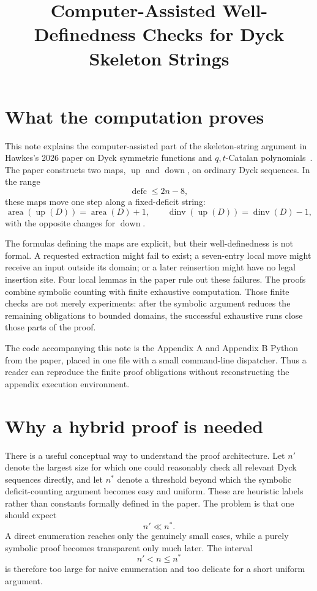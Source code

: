 \documentclass{article}
\title{Computer-Assisted Well-Definedness Checks for Dyck Skeleton Strings}
\author{}
\date{}
\newcommand{\area}{\operatorname{area}}
\newcommand{\dinv}{\operatorname{dinv}}
\newcommand{\defc}{\operatorname{defc}}
\newcommand{\upmap}{\operatorname{up}}
\newcommand{\downmap}{\operatorname{down}}
\begin{document}
\maketitle

\section{What the computation proves}

This note explains the computer-assisted part of the skeleton-string argument
in Hawkes's 2026 paper on Dyck symmetric functions and
$q,t$-Catalan polynomials~\cite{Hawkes2026}.  The paper constructs two maps,
$\upmap$ and $\downmap$, on ordinary Dyck sequences.  In the range
\[
  \defc\leq 2n-8,
\]
these maps move one step along a fixed-deficit string:
\[
  \area(\upmap(D))=\area(D)+1,
  \qquad
  \dinv(\upmap(D))=\dinv(D)-1,
\]
with the opposite changes for $\downmap$.

The formulas defining the maps are explicit, but their well-definedness is not
formal.  A requested extraction might fail to exist; a seven-entry local move
might receive an input outside its domain; or a later reinsertion might have no
legal insertion site.  Four local lemmas in the paper rule out these failures.
The proofs combine symbolic counting with finite exhaustive computation.
Those finite checks are not merely experiments: after the symbolic argument
reduces the remaining obligations to bounded domains, the successful exhaustive
runs close those parts of the proof.

The code accompanying this note is the Appendix A and Appendix B Python from
the paper, placed in one file with a small command-line dispatcher.  Thus a
reader can reproduce the finite proof obligations without reconstructing the
appendix execution environment.

\section{Why a hybrid proof is needed}

There is a useful conceptual way to understand the proof architecture.  Let
$n'$ denote the largest size for which one could reasonably check all relevant
Dyck sequences directly, and let $n^*$ denote a threshold beyond which the
symbolic deficit-counting argument becomes easy and uniform.  These are
heuristic labels rather than constants formally defined in the paper.  The
problem is that one should expect
\[
  n'\ll n^*.
\]
A direct enumeration reaches only the genuinely small cases, while a purely
symbolic proof becomes transparent only much later.  The interval
\[
  n'<n\leq n^*
\]
is therefore too large for naive enumeration and too delicate for a short
uniform argument.
\end{document}
